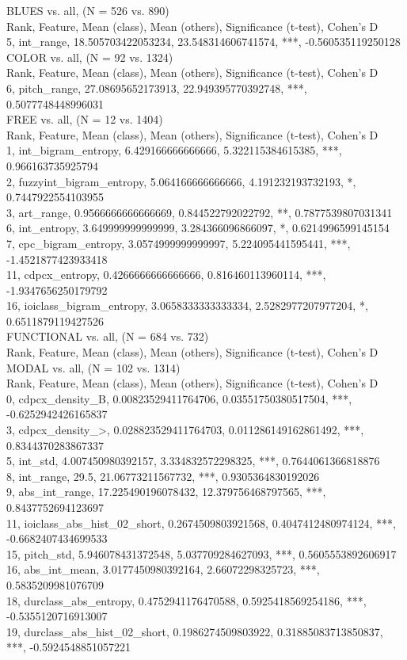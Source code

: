 BLUES vs. all, (N = 526 vs. 890)\\
Rank, Feature, Mean (class), Mean (others), Significance (t-test), Cohen's D\\
5, int_range, 18.505703422053234, 23.548314606741574, ***, -0.560535119250128\\
COLOR vs. all, (N = 92 vs. 1324)\\
Rank, Feature, Mean (class), Mean (others), Significance (t-test), Cohen's D\\
6, pitch_range, 27.08695652173913, 22.949395770392748, ***, 0.5077748448996031\\
FREE vs. all, (N = 12 vs. 1404)\\
Rank, Feature, Mean (class), Mean (others), Significance (t-test), Cohen's D\\
1, int_bigram_entropy, 6.429166666666666, 5.322115384615385, ***, 0.966163735925794\\
2, fuzzyint_bigram_entropy, 5.064166666666666, 4.191232193732193, *, 0.7447922554103955\\
3, art_range, 0.9566666666666669, 0.844522792022792, **, 0.7877539807031341\\
6, int_entropy, 3.649999999999999, 3.284366096866097, *, 0.6214996599145154\\
7, cpc_bigram_entropy, 3.0574999999999997, 5.224095441595441, ***, -1.4521877423933418\\
11, cdpcx_entropy, 0.4266666666666666, 0.816460113960114, ***, -1.9347656250179792\\
16, ioiclass_bigram_entropy, 3.0658333333333334, 2.5282977207977204, *, 0.6511879119427526\\
FUNCTIONAL vs. all, (N = 684 vs. 732)\\
Rank, Feature, Mean (class), Mean (others), Significance (t-test), Cohen's D\\
MODAL vs. all, (N = 102 vs. 1314)\\
Rank, Feature, Mean (class), Mean (others), Significance (t-test), Cohen's D\\
0, cdpcx_density_B, 0.00823529411764706, 0.03551750380517504, ***, -0.6252942426165837\\
3, cdpcx_density_>, 0.028823529411764703, 0.011286149162861492, ***, 0.8344370283867337\\
5, int_std, 4.007450980392157, 3.334832572298325, ***, 0.7644061366818876\\
8, int_range, 29.5, 21.06773211567732, ***, 0.9305364830192026\\
9, abs_int_range, 17.225490196078432, 12.379756468797565, ***, 0.8437752694123697\\
11, ioiclass_abs_hist_02_short, 0.2674509803921568, 0.4047412480974124, ***, -0.6682407434699533\\
15, pitch_std, 5.946078431372548, 5.037709284627093, ***, 0.5605553892606917\\
16, abs_int_mean, 3.0177450980392164, 2.66072298325723, ***, 0.5835209981076709\\
18, durclass_abs_entropy, 0.4752941176470588, 0.5925418569254186, ***, -0.5355120716913007\\
19, durclass_abs_hist_02_short, 0.1986274509803922, 0.31885083713850837, ***, -0.5924548851057221\\
